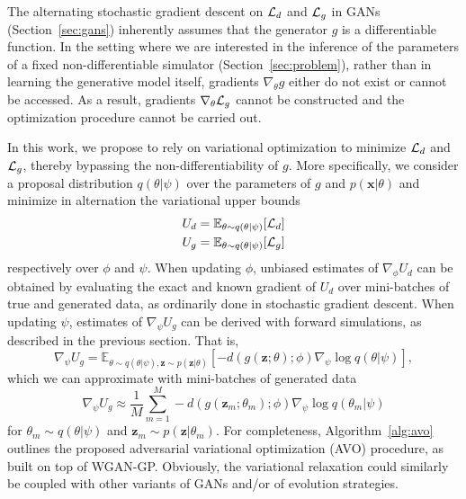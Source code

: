 \documentclass[twocolumn,superscriptaddress,aps]{revtex4-1}
\theoremstyle{plain}
\begin{document}
The alternating stochastic gradient descent on ${\cal L}_d$ and ${\cal L}_g$ in
GANs (Section~\ref{sec:gans}) inherently assumes that the generator $g$ is a differentiable function. In
the setting where we are interested in the inference of the parameters of a
fixed non-differentiable simulator (Section~\ref{sec:problem}),
rather than in learning the generative model itself,
gradients $\nabla_\theta g$ either do not exist or cannot be accessed. As a
result, gradients $\nabla_\theta {\cal L}_g$ cannot be constructed and the
optimization procedure cannot be carried out.

In this work, we propose to rely on variational optimization to minimize ${\cal
L}_d$ and ${\cal L}_g$, thereby bypassing the non-differentiability of $g$. More
specifically, we consider a proposal distribution $q(\theta|\psi)$ over the
parameters of $g$ and $p(\mathbf{x}|\theta)$ and minimize in alternation the variational upper bounds
\begin{align}
    U_d &= \mathbb{E}_{\theta \sim q(\theta|\psi)} [ {\cal L}_d ] \label{eqn:vo-ud} \\
    U_g &= \mathbb{E}_{\theta \sim q(\theta|\psi)} [ {\cal L}_g ] \label{eqn:vo-ug}
\end{align} respectively over $\phi$ and $\psi$.
When updating
$\phi$, unbiased estimates of $\nabla_\phi U_d$ can be obtained by
evaluating the exact and known gradient of $U_d$ over mini-batches of true and
generated data, as ordinarily done in stochastic gradient descent. When updating
$\psi$, estimates of $\nabla_\psi U_g$ can be derived with forward
simulations, as described in the previous section.
That is,
\begin{equation}\label{eqn:grad-ug-approx}
    \nabla_\psi U_g = \mathbb{E}_{\theta \sim q(\theta|\psi), \mathbf{z} \sim p(\mathbf{z}|\theta)}  [-d(g(\mathbf{z};\theta);\phi) \nabla_\psi \log q(\theta|\psi)],
\end{equation} which we can approximate with mini-batches of
generated data
\begin{equation}
    \nabla_\psi U_g \approx \frac{1}{M} \sum_{m=1}^M -d(g(\mathbf{z}_m; \theta_m); \phi) \nabla_\psi \log q(\theta_m|\psi)
\end{equation}
for $\theta_m \sim q(\theta|\psi)$ and $\mathbf{z}_m \sim p(\mathbf{z}|\theta_m)$.
For completeness, Algorithm~\ref{alg:avo} outlines the proposed adversarial variational
optimization (AVO) procedure, as built on top of WGAN-GP.
Obviously, the variational relaxation could similarly be coupled with
other variants of GANs and/or of evolution strategies.
\end{document}
